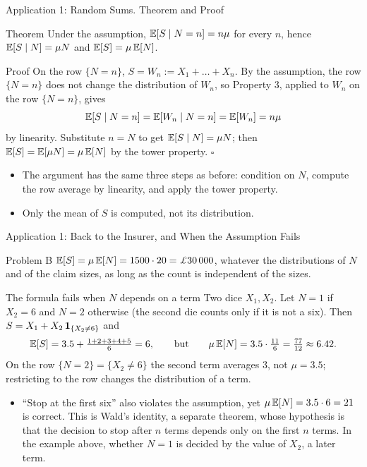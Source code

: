 \begin{frame}{Application 1: Random Sums. Theorem and Proof}
  \small
  \begin{block}{Theorem}
    Under the assumption, $\mathbb{E}[S\mid N=n]=n\mu$ for every $n$, hence $\mathbb{E}[S\mid N]=\mu N$ and $\mathbb{E}[S]=\mu\,\mathbb{E}[N]$.
  \end{block}
  \begin{block}{Proof}
    On the row $\{N=n\}$, $S=W_n:=X_1+\dots+X_n$. By the assumption, the row $\{N=n\}$ does not change the distribution of $W_n$, so Property 3, applied to $W_n$ on the row $\{N=n\}$, gives
    \[
      \mathbb{E}[S\mid N=n]=\mathbb{E}[W_n\mid N=n]=\mathbb{E}[W_n]=n\mu
    \]
    by linearity. Substitute $n=N$ to get $\mathbb{E}[S\mid N]=\mu N$; then $\mathbb{E}[S]=\mathbb{E}[\mu N]=\mu\,\mathbb{E}[N]$ by the tower property. \hfill$\square$
  \end{block}
  \begin{itemize}
    \item The argument has the same three steps as before: condition on $N$, compute the row average by linearity, and apply the tower property.
    \item Only the mean of $S$ is computed, not its distribution.
  \end{itemize}
\end{frame}

\begin{frame}{Application 1: Back to the Insurer, and When the Assumption Fails}
  \small
  \label{insurer}%
  \begin{exampleblock}{Problem B}
    $\E[S]=\mu\,\E[N]=1500\cdot20=\pounds30\,000$, whatever the distributions of $N$ and of the claim sizes, as long as the count is independent of the sizes.
  \end{exampleblock}
  \begin{exampleblock}{The formula fails when $N$ depends on a term}
    Two dice $X_1,X_2$. Let $N=1$ if $X_2=6$ and $N=2$ otherwise (the second die counts only if it is not a six). Then $S=X_1+X_2\,\mathbf{1}_{\{X_2\ne6\}}$ and
    \[
      \mathbb{E}[S]=3.5+\tfrac{1+2+3+4+5}6=6,\qquad\text{but}\qquad \mu\,\mathbb{E}[N]=3.5\cdot\tfrac{11}6=\tfrac{77}{12}\approx6.42 .
    \]
    On the row $\{N=2\}=\{X_2\ne6\}$ the second term averages $3$, not $\mu=3.5$; restricting to the row changes the distribution of a term.
  \end{exampleblock}
  \begin{itemize}
    \item ``Stop at the first six'' also violates the assumption, yet $\mu\,\mathbb{E}[N]=3.5\cdot6=21$ is correct. This is Wald's identity, a separate theorem, whose hypothesis is that the decision to stop after $n$ terms depends only on the first $n$ terms. In the example above, whether $N=1$ is decided by the value of $X_2$, a later term.
  \end{itemize}
\end{frame}

